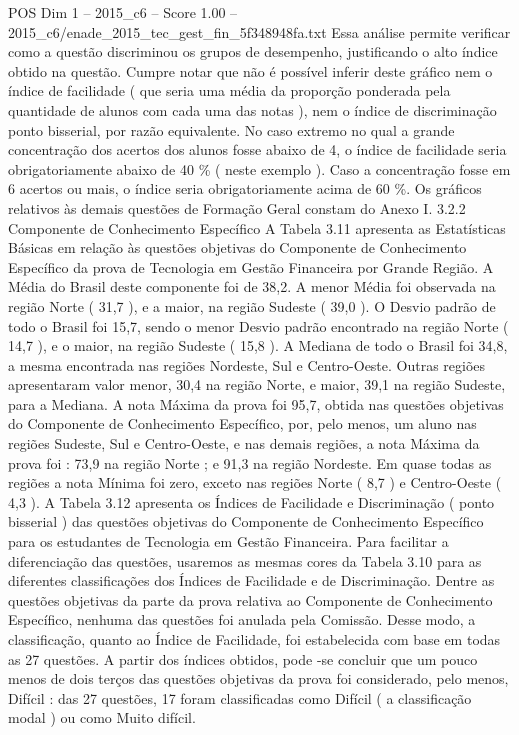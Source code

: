 \begin{textsample}{POS Dim 1 – 2015\_c6 – Score 1.00 – 2015\_c6/enade\_2015\_tec\_gest\_fin\_5f348948fa.txt}
Essa análise permite verificar como a questão discriminou os grupos de desempenho, justificando o alto índice obtido na questão.
Cumpre notar que não é possível inferir deste gráfico nem o índice de facilidade ( que seria uma média da proporção ponderada pela quantidade de alunos com cada uma das notas ), nem o índice de discriminação ponto bisserial, por razão equivalente.
No caso extremo no qual a grande concentração dos acertos dos alunos fosse abaixo de 4, o índice de facilidade seria obrigatoriamente abaixo de 40 \% ( neste exemplo ).
Caso a concentração fosse em 6 acertos ou mais, o índice seria obrigatoriamente acima de 60 \%.
Os gráficos relativos às demais questões de Formação Geral constam do Anexo I. 3.2.2 Componente de Conhecimento Específico A Tabela 3.11 apresenta as Estatísticas Básicas em relação às questões objetivas do Componente de Conhecimento Específico da prova de Tecnologia em Gestão Financeira por Grande Região.
A Média do Brasil deste componente foi de 38,2.
A menor Média foi observada na região Norte ( 31,7 ), e a maior, na região Sudeste ( 39,0 ).
O Desvio padrão de todo o Brasil foi 15,7, sendo o menor Desvio padrão encontrado na região Norte ( 14,7 ), e o maior, na região Sudeste ( 15,8 ).
A Mediana de todo o Brasil foi 34,8, a mesma encontrada nas regiões Nordeste, Sul e Centro-Oeste.
Outras regiões apresentaram valor menor, 30,4 na região Norte, e maior, 39,1 na região Sudeste, para a Mediana.
A nota Máxima da prova foi 95,7, obtida nas questões objetivas do Componente de Conhecimento Específico, por, pelo menos, um aluno nas regiões Sudeste, Sul e Centro-Oeste, e nas demais regiões, a nota Máxima da prova foi : 73,9 na região Norte ; e 91,3 na região Nordeste.
Em quase todas as regiões a nota Mínima foi zero, exceto nas regiões Norte ( 8,7 ) e Centro-Oeste ( 4,3 ).
A Tabela 3.12 apresenta os Índices de Facilidade e Discriminação ( ponto bisserial ) das questões objetivas do Componente de Conhecimento Específico para os estudantes de Tecnologia em Gestão Financeira.
Para facilitar a diferenciação das questões, usaremos as mesmas cores da Tabela 3.10 para as diferentes classificações dos Índices de Facilidade e de Discriminação.
Dentre as questões objetivas da parte da prova relativa ao Componente de Conhecimento Específico, nenhuma das questões foi anulada pela Comissão.
Desse modo, a classificação, quanto ao Índice de Facilidade, foi estabelecida com base em todas as 27 questões.
A partir dos índices obtidos, pode -se concluir que um pouco menos de dois terços das questões objetivas da prova foi considerado, pelo menos, Difícil : das 27 questões, 17 foram classificadas como Difícil ( a classificação modal ) ou como Muito difícil.

\end{textsample}
